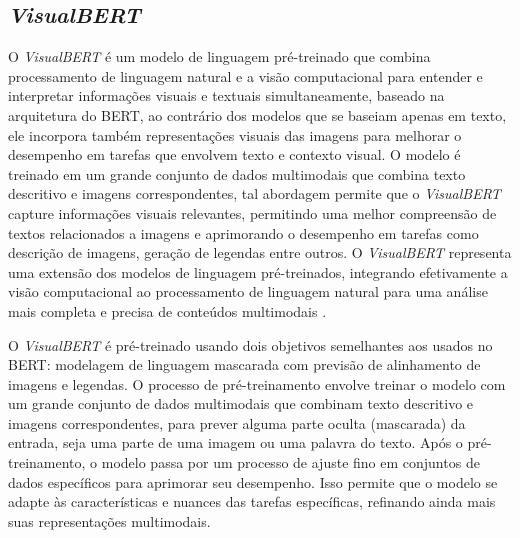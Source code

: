 

\subsection{\textit{VisualBERT}}


O \textit{VisualBERT} é um modelo de linguagem pré-treinado que combina processamento de linguagem natural e a visão computacional para entender e interpretar informações visuais e textuais simultaneamente, baseado na arquitetura do BERT, ao contrário dos modelos que se baseiam apenas em texto, ele incorpora também representações visuais das imagens para melhorar o desempenho em tarefas que envolvem texto e contexto visual. O modelo é treinado em um grande conjunto de dados multimodais que combina texto descritivo e imagens correspondentes, tal abordagem permite que o \textit{VisualBERT} capture informações visuais relevantes, permitindo uma melhor compreensão de textos relacionados a imagens e aprimorando o desempenho em tarefas como descrição de imagens, geração de legendas entre outros. O \textit{VisualBERT} representa uma extensão dos modelos de linguagem pré-treinados, integrando efetivamente a visão computacional ao processamento de linguagem natural para uma análise mais completa e precisa de conteúdos multimodais \cite{VisualBERTArt}.

O \textit{VisualBERT} é pré-treinado usando dois objetivos semelhantes aos usados no BERT: modelagem de linguagem mascarada com previsão de alinhamento de imagens e legendas. O processo de pré-treinamento envolve treinar o modelo com um grande conjunto de dados multimodais que combinam texto descritivo e imagens correspondentes, para prever alguma parte oculta (mascarada) da entrada, seja uma parte de uma imagem ou uma palavra do texto. Após o pré-treinamento, o modelo passa por um processo de ajuste fino em conjuntos de dados específicos para aprimorar seu desempenho. Isso permite que o modelo se adapte às características e nuances das tarefas específicas, refinando ainda mais suas representações multimodais.

